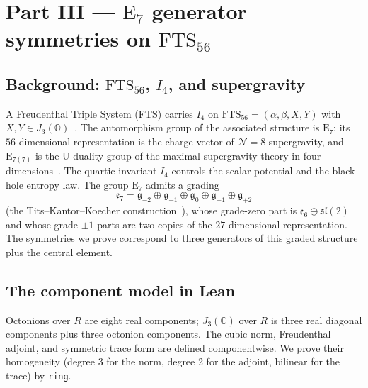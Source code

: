\documentclass[11pt]{article}
\theoremstyle{definition}
\newcommand{\OO}{\mathbb{O}}
\newcommand{\Jthree}{J_3(\OO)}
\newcommand{\Iq}{I_4}
\newcommand{\FTS}{\mathrm{FTS}_{56}}
\newcommand{\Eseven}{\mathrm{E}_7}
\newcommand{\Esevenc}{\mathrm{E}_{7(7)}}
\begin{document}
\section{Part III --- $\mathrm{E}_7$ generator symmetries on $\FTS$}
\label{sec:fts56}

\subsection{Background: $\FTS$, $\Iq$, and supergravity}
\label{sec:fts56-bg}

A Freudenthal Triple System (FTS) carries $\Iq$ on
$\FTS=(\alpha,\beta,X,Y)$ with $X,Y\in\Jthree$~\cite{freudenthal1954,
meyberg1970}. The automorphism group of the associated structure is
$\Eseven$; its $56$-dimensional representation is the charge vector of
$\mathcal{N}=8$ supergravity, and $\Esevenc$ is the U-duality group of the
maximal supergravity theory in four dimensions~\cite{cremmerjulia1979,
gunaydinSST}. The quartic invariant $\Iq$ controls the scalar potential and the
black-hole entropy law. The group $\Eseven$ admits a grading
\[
\mathfrak{e}_7 = \mathfrak{g}_{-2}\oplus\mathfrak{g}_{-1}\oplus
\mathfrak{g}_0\oplus\mathfrak{g}_{+1}\oplus\mathfrak{g}_{+2}
\]
(the Tits--Kantor--Koecher construction~\cite{tits1962,koecher1958}), whose
grade-zero part is $\mathfrak{e}_6\oplus\mathfrak{sl}(2)$ and whose
grade-$\pm1$ parts are two copies of the $27$-dimensional representation. The
symmetries we prove correspond to three generators of this graded structure
plus the central element.

\subsection{The component model in Lean}
\label{sec:fts56-model}

Octonions over $R$ are eight real components; $\Jthree$ over $R$ is three real
diagonal components plus three octonion components. The cubic norm, Freudenthal
adjoint, and symmetric trace form are defined componentwise. We prove their
homogeneity (degree 3 for the norm, degree 2 for the adjoint, bilinear for the
trace) by \texttt{ring}.
\end{document}
